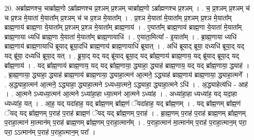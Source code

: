 \documentclass[17pt]{extarticle}
\begin{document}
20. अब्रा᳚ह्मणश्च॒ चाब्रा᳚ह्म॒णो ऽब्रा᳚ह्मणश्च प्र॒श्ञम् प्र॒श्ञम् चाब्रा᳚ह्म॒णो ऽब्रा᳚ह्मणश्च प्र॒श्ञम् । . च॒ प्र॒श्ञम् प्र॒श्ञम् च॑ च प्र॒श्ञ मे॒याता॑ मे॒याता᳚म् प्र॒श्ञम् च॑ च प्र॒श्ञ मे॒याता᳚म् । . प्र॒श्ञ मे॒याता॑ मे॒याता᳚म् प्र॒श्ञम् प्र॒श्ञ मे॒याता᳚म् ब्राह्म॒णाय॑ ब्राह्म॒णा ये॒याता᳚म् प्र॒श्ञम् प्र॒श्ञ मे॒याता᳚म् ब्राह्म॒णाय॑ । . ए॒याता᳚म् ब्राह्म॒णाय॑ ब्राह्म॒णा ये॒याता॑ मे॒याता᳚म् ब्राह्म॒णाया ध्यधि॑ ब्राह्म॒णा ये॒याता॑ मे॒याता᳚म् ब्राह्म॒णायाधि॑ । . ए॒याता॒मित्या᳚ - इ॒याता᳚म् । . ब्रा॒ह्म॒णाया ध्यधि॑ ब्राह्म॒णाय॑ ब्राह्म॒णायाधि॑ ब्रूयाद् ब्रूया॒दधि॑ ब्राह्म॒णाय॑ ब्राह्म॒णायाधि॑ ब्रूयात् । . अधि॑ ब्रूयाद् ब्रूया॒ दध्यधि॑ ब्रूया॒द् यद् यद् ब्रू॑या॒ दध्यधि॑ ब्रूया॒द् यत् । . ब्रू॒या॒द् यद् यद् ब्रू॑याद् ब्रूया॒द् यद् ब्रा᳚ह्म॒णाय॑ ब्राह्म॒णाय॒ यद् ब्रू॑याद् ब्रूया॒द् यद् ब्रा᳚ह्म॒णाय॑ । . यद् ब्रा᳚ह्म॒णाय॑ ब्राह्म॒णाय॒ यद् यद् ब्रा᳚ह्म॒णाया॒ द्ध्याहा॒ द्ध्याह॑ ब्राह्म॒णाय॒ यद् यद् ब्रा᳚ह्म॒णाया॒ द्ध्याह॑ । . ब्रा॒ह्म॒णाया॒ द्ध्याहा॒ द्ध्याह॑ ब्राह्म॒णाय॑ ब्राह्म॒णाया॒ द्ध्याहा॒त्मन॑ आ॒त्मने॒ ऽद्ध्याह॑ ब्राह्म॒णाय॑ ब्राह्म॒णाया॒ द्ध्याहा॒त्मने᳚ । . अ॒द्ध्याहा॒त्मन॑ आ॒त्मने॒ ऽद्ध्याहा॒ द्ध्याहा॒त्मने ऽध्यध्या॒त्मने॒ ऽद्ध्याहा॒ द्ध्याहा॒त्मने ऽधि॑ । . अ॒द्ध्याहेत्य॑धि - आह॑ । . आ॒त्मने ऽध्यध्या॒त्मन॑ आ॒त्मने ऽध्या॑हा॒हा ध्या॒त्मन॑ आ॒त्मने ऽध्या॑ह । . अध्या॑हा॒हा ध्यध्या॑ह॒ यद् यदा॒हा ध्यध्या॑ह॒ यत् । . आ॒ह॒ यद् यदा॑हाह॒ यद् ब्रा᳚ह्म॒णम् ब्रा᳚ह्म॒णं ॅयदा॑हाह॒ यद् ब्रा᳚ह्म॒णम् । . यद् ब्रा᳚ह्म॒णम् ब्रा᳚ह्म॒णं ॅयद् यद् ब्रा᳚ह्म॒णम् प॒राह॑ प॒राह॑ ब्राह्म॒णं ॅयद् यद् ब्रा᳚ह्म॒णम् प॒राह॑ । . ब्रा॒ह्म॒णम् प॒राह॑ प॒राह॑ ब्राह्म॒णम् ब्रा᳚ह्म॒णम् प॒राहा॒त्मान॑ मा॒त्मान॑म् प॒राह॑ ब्राह्म॒णम् ब्रा᳚ह्म॒णम् प॒राहा॒त्मान᳚म् । . प॒राहा॒त्मान॑ मा॒त्मान॑म् प॒राह॑ प॒राहा॒त्मान॒म् परा॒ परा॒ ऽऽत्मान॑म् प॒राह॑ प॒राहा॒त्मान॒म् परा᳚ । \newline
\end{document}
